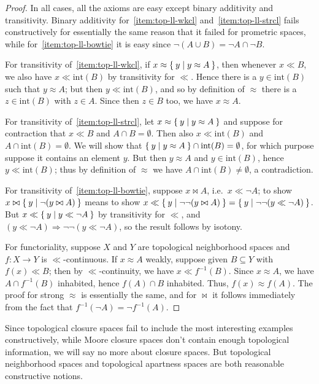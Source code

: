 \documentclass{article}
\def\int{\mathrm{int}}
\def\cpl#1{\neg #1}
\let\implies\Rightarrow
\def\inv{^{-1}}
\begin{document}
\begin{proof}
  In all cases, all the axioms are easy except binary additivity and transitivity.
  Binary additivity for~\ref{item:top-ll-wkcl} and~\ref{item:top-ll-strcl} fails constructively for essentially the same reason that it failed for prometric spaces, while for~\ref{item:top-ll-bowtie} it is easy since $\cpl{(A\cup B)} = \cpl{A} \cap \cpl{B}$.

  For transitivity of~\ref{item:top-ll-wkcl}, if $x\approx \Set{y | y\approx A}$, then whenever $x\ll B$, we also have $x\ll \int(B)$ by transitivity for $\ll$.
  Hence there is a $y\in \int(B)$ such that $y\approx A$; but then $y\ll \int(B)$, and so by definition of $\approx$ there is a $z\in\int(B)$ with $z\in A$.
  Since then $z\in B$ too, we have $x\approx A$.

  For transitivity of~\ref{item:top-ll-strcl}, let $x\approx \Set{y | y\approx A}$ and suppose for contraction that $x\ll B$ and $A\cap B =\emptyset$.
  Then also $x\ll \int(B)$ and $A\cap \int(B)=\emptyset$.
  We will show that $\setof{y | y\approx A} \cap \int(B) = \emptyset$, for which purpose suppose it contains an element $y$.
  But then $y\approx A$ and $y\in \int(B)$, hence $y\ll \int(B)$; thus by definition of $\approx$ we have $A\cap \int(B) \neq \emptyset$, a contradiction.

  For transitivity of~\ref{item:top-ll-bowtie}, suppose $x\bowtie A$, i.e.\ $x\ll \cpl{A}$; to show $x\bowtie \Set{y|\neg(y\bowtie A)}$ means to show $x\ll \setof{y|\neg\neg(y\bowtie A)} = \setof{y|\neg\neg(y\ll \cpl{A})}$.
  But $x\ll \setof{y|y\ll \cpl{A}}$ by transitivity for $\ll$, and $(y\ll \cpl{A})\implies\neg\neg(y\ll\cpl{A})$, so the result follows by isotony.

  For functoriality, suppose $X$ and $Y$ are topological neighborhood spaces and $f:X\to Y$ is $\ll$-continuous.
  If $x\approx A$ weakly, suppose given $B\subseteq Y$ with $f(x)\ll B$; then by $\ll$-continuity, we have $x\ll f\inv(B)$.
  Since $x\approx A$, we have $A\cap f\inv(B)$ inhabited, hence $f(A) \cap B$ inhabited.
  Thus, $f(x)\approx f(A)$.
  The proof for strong $\approx$ is essentially the same, and for $\bowtie$ it follows immediately from the fact that $f\inv(\cpl{A}) = \cpl{f\inv(A)}$.
\end{proof}

Since topological closure spaces fail to include the most interesting examples constructively, while Moore closure spaces don't contain enough topological information, we will say no more about closure spaces.
But topological neighborhood spaces and topological apartness spaces are both reasonable constructive notions.
\end{document}
